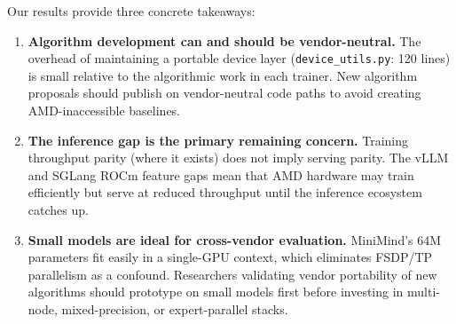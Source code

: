 Our results provide three concrete takeaways:

\begin{enumerate}
\item \textbf{Algorithm development can and should be vendor-neutral.}
  The overhead of maintaining a portable device layer
  (\texttt{device\_utils.py}: 120 lines) is small relative to the algorithmic
  work in each trainer.  New algorithm proposals should publish on
  vendor-neutral code paths to avoid creating AMD-inaccessible baselines.

\item \textbf{The inference gap is the primary remaining concern.}
  Training throughput parity (where it exists) does not imply serving parity.
  The vLLM and SGLang ROCm feature gaps mean that AMD hardware may train
  efficiently but serve at reduced throughput until the inference ecosystem
  catches up.

\item \textbf{Small models are ideal for cross-vendor evaluation.}
  MiniMind's 64M parameters fit easily in a single-GPU context, which
  eliminates FSDP/TP parallelism as a confound.  Researchers validating
  vendor portability of new algorithms should prototype on small models first
  before investing in multi-node, mixed-precision, or expert-parallel stacks.
\end{enumerate}
